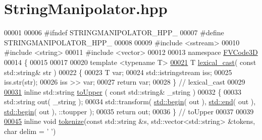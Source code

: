 \hypertarget{StringManipolator_8hpp_source}{}\section{String\+Manipolator.\+hpp}
\label{StringManipolator_8hpp_source}

\begin{DoxyCode}
00001 
00006 \textcolor{preprocessor}{#ifndef STRINGMANIPOLATOR\_HPP\_}
00007 \textcolor{preprocessor}{#define STRINGMANIPOLATOR\_HPP\_}
00008 
00009 \textcolor{preprocessor}{#include <sstream>}
00010 \textcolor{preprocessor}{#include <string>}
00011 \textcolor{preprocessor}{#include <vector>}
00012 
00013 \textcolor{keyword}{namespace }\hyperlink{namespaceFVCode3D}{FVCode3D}
00014 \{
00015 
00017 
00020 \textcolor{keyword}{template} <\textcolor{keyword}{typename} T>
\hypertarget{StringManipolator_8hpp_source.tex_l00021}{}\hyperlink{namespaceFVCode3D_a7d8605df83383ec5cf62f7efe480a68a}{00021} T \hyperlink{namespaceFVCode3D_a7d8605df83383ec5cf62f7efe480a68a}{lexical\_cast}( \textcolor{keyword}{const} std::string& str )
00022 \{
00023     T var;
00024     std::istringstream iss;
00025     iss.str(str);
00026     iss >> var;
00027     \textcolor{keywordflow}{return} var;
00028 \} \textcolor{comment}{// lexical\_cast}
00029 
\hypertarget{StringManipolator_8hpp_source.tex_l00031}{}\hyperlink{namespaceFVCode3D_aab0ceb729c2ff3e7fd288097aee76a59}{00031} \textcolor{keyword}{inline} std::string \hyperlink{namespaceFVCode3D_aab0ceb729c2ff3e7fd288097aee76a59}{toUpper} ( \textcolor{keyword}{const} std::string& \_string )
00032 \{
00033     std::string out( \_string );
00034     std::transform( \hyperlink{namespacestd_acec9a198880c12f51f02be95a298a48b}{std::begin}( out ), \hyperlink{namespacestd_aeb4b319cf9afda99ba1f47d32df15bc9}{std::end}( out ), 
      \hyperlink{namespacestd_acec9a198880c12f51f02be95a298a48b}{std::begin}( out ), ::toupper );
00035     \textcolor{keywordflow}{return} out;
00036 \} \textcolor{comment}{// toUpper}
00037 
00039 
\hypertarget{StringManipolator_8hpp_source.tex_l00045}{}\hyperlink{namespaceFVCode3D_a7bd098182831904c8fcd227b9d0f4562}{00045} \textcolor{keyword}{inline} \textcolor{keywordtype}{void} \hyperlink{namespaceFVCode3D_a7bd098182831904c8fcd227b9d0f4562}{tokenize}(\textcolor{keyword}{const} std::string &s, std::vector<std::string> &tokens, \textcolor{keywordtype}{char} delim = \textcolor{charliteral}{' '})

\end{DoxyCode}
